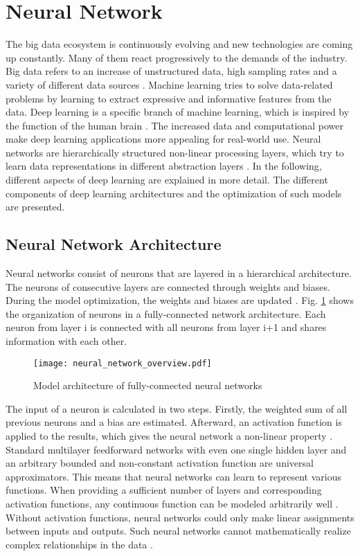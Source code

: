 \section{Neural Network}
The big data ecosystem is continuously evolving and new technologies are coming up constantly. Many of them react progressively to the demands of the industry. Big data refers to an increase of unstructured data, high sampling rates and a variety of different data sources \cite{Sagiroglu2013}. Machine learning tries to solve data-related problems by learning to extract expressive and informative features from the data. Deep learning is a specific branch of machine learning, which is inspired by the function of the human brain \cite{Calin2020}. The increased data and computational power make deep learning applications more appealing for real-world use. Neural networks are hierarchically structured non-linear processing layers, which try to learn data representations in different abstraction layers \cite{ZHAO2019213}. In the following, different aspects of deep learning are explained in more detail. The different components of deep learning architectures and the optimization of such models are presented. 

\subsection{Neural Network Architecture}
Neural networks consist of neurons that are layered in a hierarchical architecture. The neurons of consecutive layers are connected through weights and biases. During the model optimization, the weights and biases are updated \cite{ShilohPerl2020}. Fig. \ref{fig:neural_network_overview} shows the organization of neurons in a fully-connected network architecture. Each neuron from layer i is connected with all neurons from layer i+1 and shares information with each other.

\begin{figure}[H]
  \centering
  \texttt{[image: neural\_network\_overview.pdf]}
  \caption {Model architecture of fully-connected neural networks}
  \label{fig:neural_network_overview}
\end{figure}
The input of a neuron is calculated in two steps. Firstly, the weighted sum of all previous neurons and a bias are estimated. Afterward, an activation function is applied to the results, which gives the neural network a non-linear property \cite{ShilohPerl2020}. Standard multilayer feedforward networks with even one single hidden layer and an arbitrary bounded and non-constant activation function are universal approximators. This means that neural networks can learn to represent various functions. When providing a sufficient number of layers and corresponding activation functions, any continuous function can be modeled arbitrarily well \cite{HORNIK1991}. Without activation functions, neural networks could only make linear assignments between inputs and outputs. Such neural networks cannot mathematically realize complex relationships in the data \cite{Ding2018}.

